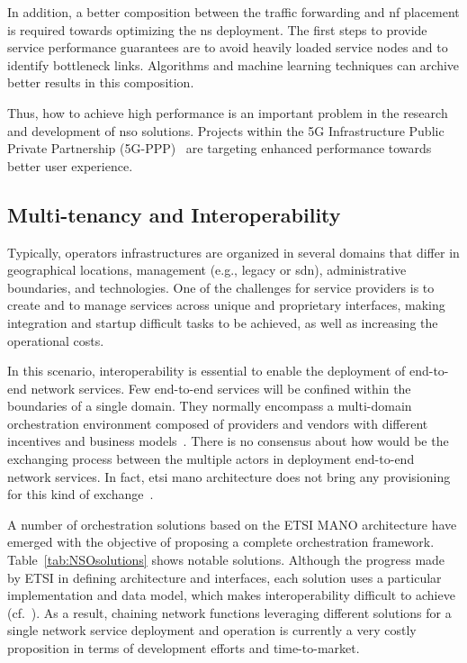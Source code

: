 In addition, a better composition between the traffic forwarding and \gls{nf} placement is required towards optimizing the \gls{ns} deployment. The first steps to provide service performance guarantees are to avoid heavily loaded service nodes and to identify bottleneck links. Algorithms and machine learning techniques can archive better results in this composition.   

Thus, how to achieve high performance is an important problem in the research and development of \gls{nso} solutions. Projects within the 5G Infrastructure Public Private Partnership (5G-PPP)~\cite{elayoubi:hal-01488208} are targeting enhanced performance towards better user experience. 

\subsection{Multi-tenancy and Interoperability}

Typically, operators infrastructures are organized in several domains that differ in geographical locations, management (e.g., legacy or \gls{sdn}), administrative boundaries, and technologies. One of the challenges for service providers is to create and to manage services across unique and proprietary interfaces, making integration and startup difficult tasks to be achieved, as well as increasing the operational costs.  

In this scenario, interoperability is essential to enable the deployment of end-to-end network services. Few end-to-end services will be confined within the boundaries of a single domain. They normally encompass a multi-domain orchestration environment composed of providers and vendors with different incentives and business models~\cite{Katsalis2016Multi-DomainDirections}. There is no consensus about how would be the exchanging process between the multiple actors in deployment end-to-end network services. In fact, \gls{etsi} \gls{mano} architecture does not bring any provisioning for this kind of exchange~\cite{ETSIIndustrySpecificationGroupISGNFV2014NetworkNFV}. 

A number of orchestration solutions based on the ETSI MANO architecture have emerged with the objective of proposing a complete orchestration framework. Table~\ref{tab:NSOsolutions} shows notable solutions. Although the progress made by ETSI in defining architecture and interfaces, each solution uses a particular implementation and data model, which makes interoperability difficult to achieve (cf.~\cite{NOn}). As a result, chaining network functions leveraging different solutions for a single network service deployment and operation is currently a very costly proposition in terms of development efforts and time-to-market.   

